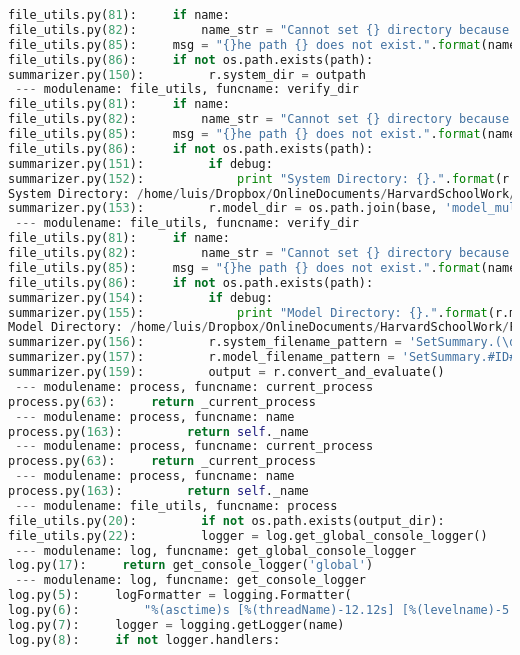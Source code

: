 \documentclass[11pt]{article}
\begin{document}
\begin{lstlisting}[language=Python]
file_utils.py(81):     if name:
file_utils.py(82):         name_str = "Cannot set {} directory because t".format(name)
file_utils.py(85):     msg = "{}he path {} does not exist.".format(name_str, path)
file_utils.py(86):     if not os.path.exists(path):
summarizer.py(150):         r.system_dir = outpath
 --- modulename: file_utils, funcname: verify_dir
file_utils.py(81):     if name:
file_utils.py(82):         name_str = "Cannot set {} directory because t".format(name)
file_utils.py(85):     msg = "{}he path {} does not exist.".format(name_str, path)
file_utils.py(86):     if not os.path.exists(path):
summarizer.py(151):         if debug:
summarizer.py(152):             print "System Directory: {}.".format(r.system_dir)
System Directory: /home/luis/Dropbox/OnlineDocuments/HarvardSchoolWork/Fall2015/cs182/project/sample_rouge_data/grasshopper.
summarizer.py(153):         r.model_dir = os.path.join(base, 'model_multi')
 --- modulename: file_utils, funcname: verify_dir
file_utils.py(81):     if name:
file_utils.py(82):         name_str = "Cannot set {} directory because t".format(name)
file_utils.py(85):     msg = "{}he path {} does not exist.".format(name_str, path)
file_utils.py(86):     if not os.path.exists(path):
summarizer.py(154):         if debug:
summarizer.py(155):             print "Model Directory: {}.".format(r.model_dir)
Model Directory: /home/luis/Dropbox/OnlineDocuments/HarvardSchoolWork/Fall2015/cs182/project/sample_rouge_data/model_multi.
summarizer.py(156):         r.system_filename_pattern = 'SetSummary.(\d+).txt'
summarizer.py(157):         r.model_filename_pattern = 'SetSummary.#ID#.[A-Z].txt'
summarizer.py(159):         output = r.convert_and_evaluate()
 --- modulename: process, funcname: current_process
process.py(63):     return _current_process
 --- modulename: process, funcname: name
process.py(163):         return self._name
 --- modulename: process, funcname: current_process
process.py(63):     return _current_process
 --- modulename: process, funcname: name
process.py(163):         return self._name
 --- modulename: file_utils, funcname: process
file_utils.py(20):         if not os.path.exists(output_dir):
file_utils.py(22):         logger = log.get_global_console_logger()
 --- modulename: log, funcname: get_global_console_logger
log.py(17):     return get_console_logger('global')
 --- modulename: log, funcname: get_console_logger
log.py(5):     logFormatter = logging.Formatter(
log.py(6):         "%(asctime)s [%(threadName)-12.12s] [%(levelname)-5.5s]  %(message)s")
log.py(7):     logger = logging.getLogger(name)
log.py(8):     if not logger.handlers:

\end{lstlisting}
\end{document}
